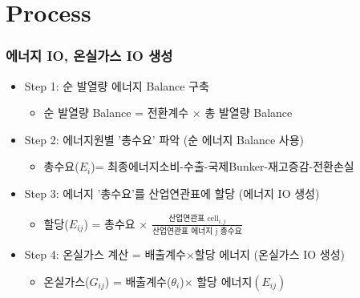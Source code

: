 \documentclass[10pt,compress,slidetop,%
			   hyperref={unicode},xcolor={svgnames},%
			   t]{beamer}
\begin{document}
\section{Process}
%
\begin{frame}
	\frametitle{에너지 IO, 온실가스 IO 생성}
	\begin{itemize}
	\item{Step 1: 순 발열량 에너지 Balance 구축}
	\bigskip
		\begin{itemize}
		\item{ 순 발열량 Balance = 전환계수 $\times$ 총 발열량 Balance}
		\end{itemize}
	\bigskip
	\item{Step 2: 에너지원별 '총수요' 파악 (순 에너지 Balance 사용)}
	\bigskip
		\begin{itemize}
		\item{ 총수요($E_i$)= 최종에너지소비-수출-국제Bunker-재고증감-전환손실}
		\end{itemize}
	\bigskip
	\item{Step 3: 에너지 '총수요'를 산업연관표에 할당 (에너지 IO 생성)}
         \begin{itemize}
		\item{ 할당($E_{ij}$) = 총수요 $\times$ $\frac{\mbox{산업연관표 cell}_{i,j}}{\mbox{산업연관표 에너지 j 총수요}}$}
		\end{itemize}
	\bigskip
	\item{Step 4: 온실가스 계산 = 배출계수$\times$할당 에너지 (온실가스 IO 생성)}
		\begin{itemize}
		\item{ 온실가스($G_{ij}$) = 배출계수($\theta_i$)$\times$ 할당 에너지$(E_{ij})$}
		\end{itemize}
	\end{itemize}
	
\end{frame}
%
\end{document}
